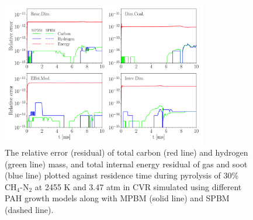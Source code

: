
\begin{figure}[H]
	\centering
	\includegraphics[width=0.8\textwidth]{Figures/Results/Validation/ConstUV/relerr_constuv.pdf}
	\caption{The relative error (residual) of total carbon (red line) and hydrogen (green line) mass, and total internal energy residual of gas and soot (blue line) plotted against residence time during pyrolysis of 30\% $\mathrm{CH_4}$-$\mathrm{N_2}$ at 2455 K and 3.47 atm in CVR simulated using different PAH growth models along with MPBM (solid line) and SPBM (dashed line).}
	\label{fig:constuvvalid}
\end{figure}



